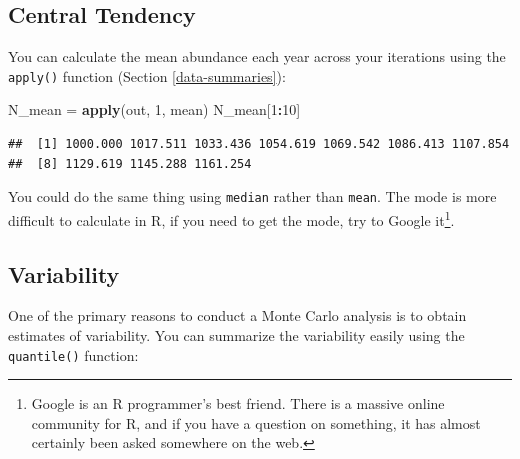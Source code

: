 \documentclass[]{book}
\newenvironment{Shaded}{\begin{snugshade}}{\end{snugshade}}
\newcommand{\KeywordTok}[1]{\textcolor[rgb]{0.13,0.29,0.53}{\textbf{#1}}}
\newcommand{\DataTypeTok}[1]{\textcolor[rgb]{0.13,0.29,0.53}{#1}}
\newcommand{\DecValTok}[1]{\textcolor[rgb]{0.00,0.00,0.81}{#1}}
\newcommand{\FloatTok}[1]{\textcolor[rgb]{0.00,0.00,0.81}{#1}}
\newcommand{\StringTok}[1]{\textcolor[rgb]{0.31,0.60,0.02}{#1}}
\newcommand{\CommentTok}[1]{\textcolor[rgb]{0.56,0.35,0.01}{\textit{#1}}}
\newcommand{\ControlFlowTok}[1]{\textcolor[rgb]{0.13,0.29,0.53}{\textbf{#1}}}
\newcommand{\OperatorTok}[1]{\textcolor[rgb]{0.81,0.36,0.00}{\textbf{#1}}}
\newcommand{\NormalTok}[1]{#1}
\let\rmarkdownfootnote\footnote%
\def\footnote{\protect\rmarkdownfootnote}
\theoremstyle{definition}
\theoremstyle{definition}
\theoremstyle{definition}
\theoremstyle{remark}
\begin{document}
\subsection{Central Tendency}\label{central-tendency}

You can calculate the mean abundance each year across your iterations
using the \texttt{apply()} function (Section \ref{data-summaries}):

\begin{Shaded}
\begin{Highlighting}[]
\NormalTok{N_mean =}\StringTok{ }\KeywordTok{apply}\NormalTok{(out, }\DecValTok{1}\NormalTok{, mean)}
\NormalTok{N_mean[}\DecValTok{1}\OperatorTok{:}\DecValTok{10}\NormalTok{]}
\end{Highlighting}
\end{Shaded}

\begin{verbatim}
##  [1] 1000.000 1017.511 1033.436 1054.619 1069.542 1086.413 1107.854
##  [8] 1129.619 1145.288 1161.254
\end{verbatim}

You could do the same thing using \texttt{median} rather than
\texttt{mean}. The mode is more difficult to calculate in R, if you need
to get the mode, try to Google it\footnote{Google is an R programmer's
  best friend. There is a massive online community for R, and if you
  have a question on something, it has almost certainly been asked
  somewhere on the web.}.

\subsection{Variability}\label{variability}

One of the primary reasons to conduct a Monte Carlo analysis is to
obtain estimates of variability. You can summarize the variability
easily using the \texttt{quantile()} function:

\begin{Shaded}
\end{Shaded}
\end{document}
